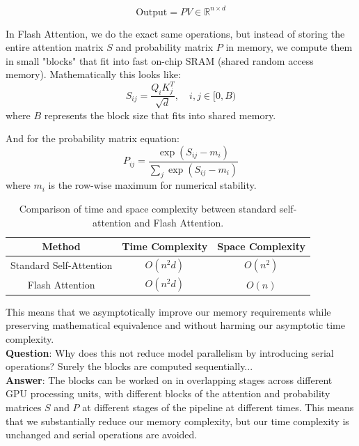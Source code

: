 \documentclass[12pt]{article}
\begin{document}
\[
\text{Output} = PV \in \mathbb{R}^{n\times d}
\]

In Flash Attention, we do the exact same operations, but instead of storing the entire attention matrix \(S\) and probability matrix \(P\) in memory, we compute them in small "blocks" that fit into fast on-chip SRAM (shared random access memory). Mathematically this looks like: 
\[
S_{ij} = \frac{Q_i K_j^T}{\sqrt{d}}, \quad i, j \in [0, B)
\]
where \( B \) represents the block size that fits into shared memory.

And for the probability matrix equation:
\[
P_{ij} = \frac{\exp(S_{ij} - m_i)}{\sum_j \exp(S_{ij} - m_i)}
\]
where \( m_i \) is the row-wise maximum for numerical stability.

\begin{table}[h]
\centering
\begin{tabular}{|c|c|c|}
\hline
\textbf{Method} & \textbf{Time Complexity} & \textbf{Space Complexity} \\
\hline
Standard Self-Attention & \( O(n^2 d) \) & \( O(n^2) \) \\
\hline
Flash Attention & \( O(n^2 d) \) & \( O(n) \) \\
\hline
\end{tabular}
\caption{Comparison of time and space complexity between standard self-attention and Flash Attention.}
\end{table}

This means that we asymptotically improve our memory requirements while preserving mathematical equivalence and without harming our asymptotic time complexity.\\

\textbf{Question}: Why does this not reduce model parallelism by introducing serial operations? Surely the blocks are computed sequentially...\\

\textbf{Answer}: The blocks can be worked on in overlapping stages across different GPU processing units, with different blocks of the attention and probability matrices \(S\) and \(P\) at different stages of the pipeline at different times. This means that we substantially reduce our memory complexity, but our time complexity is unchanged and serial operations are avoided. \\
\end{document}

